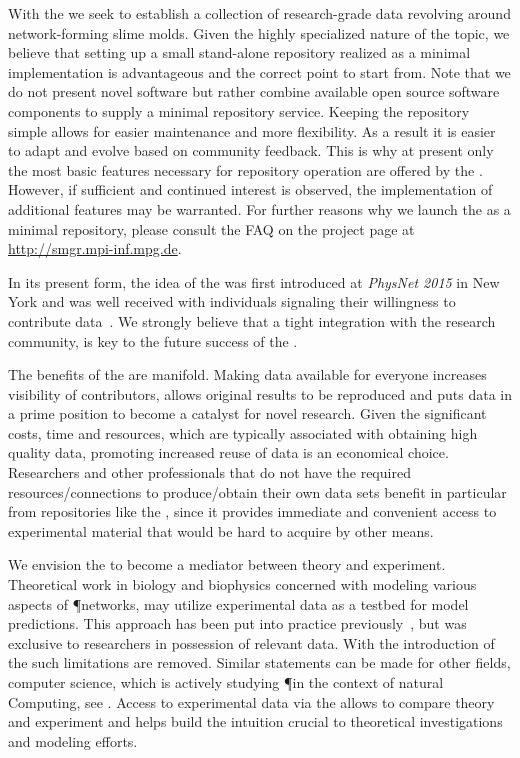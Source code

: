	With the \SMGR we seek to establish a collection of research-grade data revolving around network-forming slime molds. Given the highly specialized nature of the topic, we believe that setting up a small stand-alone repository realized as a minimal implementation is advantageous and the correct point to start from. Note that we do not present novel software but rather combine available open source software components to supply a minimal repository service. Keeping the repository simple allows for easier maintenance and more flexibility. As a result it is easier to adapt and evolve based on community feedback. This is why at present only the most basic features necessary for repository operation are offered by the \SMGR. However, if sufficient and continued interest is observed, the implementation of additional features may be warranted. For further reasons why we launch the \SMGR as a minimal repository, please consult the FAQ on the \SMGR project page at \href{http://smgr.mpi-inf.mpg.de}{http://smgr.mpi-inf.mpg.de}. 

	In its present form, the idea of the \SMGR was first introduced at \emph{PhysNet 2015} in New York and was well received with individuals signaling their willingness to contribute data~\cite{physnet2015}. We strongly believe that a tight integration with the research community, is key to the future success of the \SMGR. 

	The benefits of the \SMGR are manifold. Making data available for everyone increases visibility of contributors, allows original results to be reproduced and puts data in a prime position to become a catalyst for novel research. Given the significant costs, \ie time and resources, which are typically associated with obtaining high quality data, promoting increased reuse of data is an economical choice. Researchers and other professionals that do not have the required resources/connections to produce/obtain their own data sets benefit in particular from repositories like the \SMGR, since it provides immediate and convenient access to experimental material that would be hard to acquire by other means. 

	We envision the \SMGR to become a mediator between theory and experiment. Theoretical work in biology and biophysics concerned with modeling various aspects of \P networks, may utilize experimental data as a testbed for model predictions. This approach has been put into practice previously~\cite{baumgarten2015network}, but was exclusive to researchers in possession of relevant data. With the introduction of the \SMGR such limitations are removed. Similar statements can be made for other fields, \eg computer science, which is actively studying \P in the context of natural Computing, see . Access to experimental data via the \SMGR allows to compare theory and experiment and helps build the intuition crucial to theoretical investigations and modeling efforts. 

